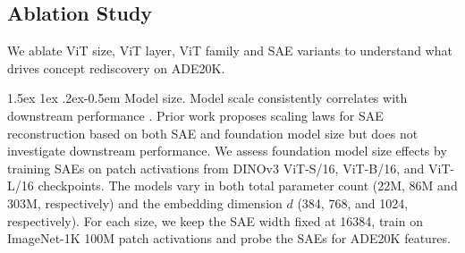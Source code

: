\documentclass[runningheads]{llncs}
\makeatletter
\newcommand{\sam}[1]{\textbf{\color{blue}[Sam: #1]}}
\newcommand{\jake}[1]{\textbf{\color{green}[Jake: #1]}}
\renewcommand{\paragraph}{%
  \@startsection{paragraph}{4}%
  {\z@}{1.5ex \@plus 1ex \@minus .2ex}{-0.5em}%
  {\normalfont\normalsize\bfseries}%
}
\makeatother
\begin{document}
% 



\subsection{Ablation Study}\label{sec:ablations}

We ablate ViT size, ViT layer, ViT family and SAE variants to understand what drives concept rediscovery on ADE20K.

\paragraph{Model size.}\label{sec:ablation-size}
Model scale consistently correlates with downstream performance \citep{kaplan2020scaling,hoffmann2022training}.
Prior work proposes scaling laws for SAE reconstruction based on both SAE and foundation model size \citep{gao2025scaling} but does not investigate downstream performance.
We assess foundation model size effects by training SAEs on patch activations from DINOv3 ViT-S/16, ViT-B/16, and ViT-L/16 checkpoints.
The models vary in both total parameter count (\num{22}M, \num{86}M and \num{303}M, respectively) and the embedding dimension $d$ (\num{384}, \num{768}, and \num{1024}, respectively).
For each size, we keep the SAE width fixed at \num{16384}, train on ImageNet-1K \num{100}M patch activations and probe the SAEs for ADE20K features.
\end{document}
